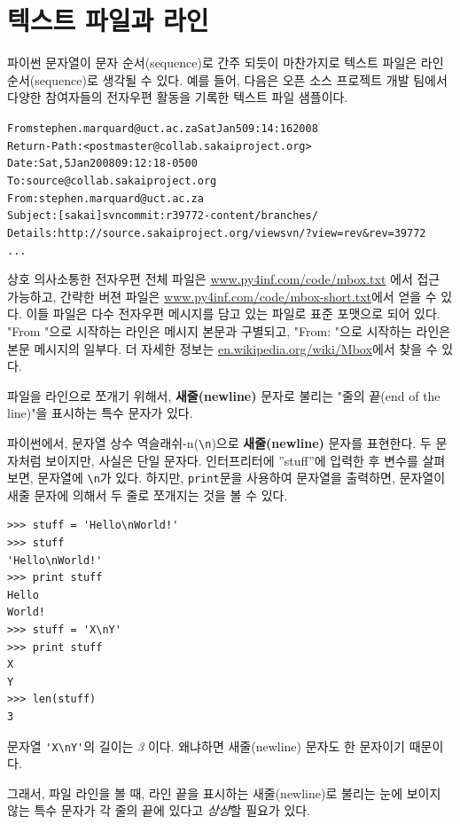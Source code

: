 \section{텍스트 파일과 라인}

파이썬 문자열이 문자 순서(sequence)로 간주 되듯이 마찬가지로 텍스트 파일은 라인 순서(sequence)로 생각될 수 있다.
예를 들어, 다음은 오픈 소스 프로젝트 개발 팀에서 다양한 참여자들의 전자우편 활동을 기록한 텍스트 파일 샘플이다.

\beforeverb
\begin{alltt}
From stephen.marquard@uct.ac.za Sat Jan  5 09:14:16 2008
Return-Path: <postmaster@collab.sakaiproject.org>
Date: Sat, 5 Jan 2008 09:12:18 -0500
To: source@collab.sakaiproject.org
From: stephen.marquard@uct.ac.za
Subject: [sakai] svn commit: r39772 - content/branches/
Details: http://source.sakaiproject.org/viewsvn/?view=rev\&rev=39772
...
\end{alltt}
\afterverb

상호 의사소통한 전자우편 전체 파일은  \url{www.py4inf.com/code/mbox.txt} 에서 접근 가능하고, 
간략한 버젼 파일은 \url{www.py4inf.com/code/mbox-short.txt}에서 얻을 수 있다.
이들 파일은 다수 전자우편 메시지를 담고 있는 파일로 표준 포맷으로 되어 있다.
"From "으로 시작하는 라인은 메시지 본문과 구별되고, "From: "으로 시작하는 라인은 본문 메시지의 일부다.
더 자세한 정보는 \url{en.wikipedia.org/wiki/Mbox}에서 찾을 수 있다.

파일을 라인으로 쪼개기 위해서, {\bf 새줄(newline)} 문자로 불리는 "줄의 끝(end of the line)"을 표시하는 특수 문자가 있다.


파이썬에서, 문자열 상수 역슬래쉬-n(\verb"\n")으로 {\bf 새줄(newline)} 문자를 표현한다.
두 문자처럼 보이지만, 사실은 단일 문자다. 인터프리터에 ''stuff''에 입력한 후 변수를 살펴보면, 문자열에 \verb"\n"가 있다.
하지만, {\tt print}문을 사용하여 문자열을 출력하면, 문자열이 새줄 문자에 의해서 두 줄로 쪼개지는 것을 볼 수 있다.

\beforeverb
\begin{verbatim}
>>> stuff = 'Hello\nWorld!'
>>> stuff
'Hello\nWorld!'
>>> print stuff
Hello
World!
>>> stuff = 'X\nY'
>>> print stuff
X
Y
>>> len(stuff)
3
\end{verbatim}
\afterverb
%

문자열 \verb"'X\nY'"의 길이는 \emph{3} 이다. 왜냐하면 새줄(newline) 문자도 한 문자이기 때문이다.

그래서, 파일 라인을 볼 때, 라인 끝을 표시하는 새줄(newline)로 불리는 눈에 보이지 않는 특수 문자가 각 줄의 끝에 있다고 \emph{상상}할 필요가 있다.

